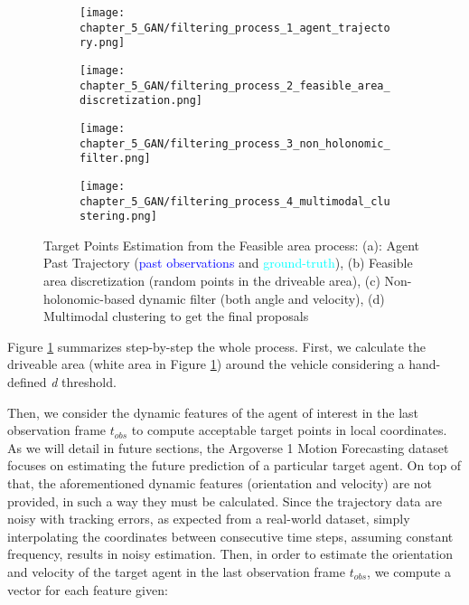 \begin{figure}[!ht]
	\centering
	\begin{subfigure}{0.24\textwidth}
		\texttt{[image: chapter\_5\_GAN/filtering\_process\_1\_agent\_trajectory.png]}	
		\caption{}
	\end{subfigure}
	\hfill
	\begin{subfigure}{0.24\textwidth}
		\texttt{[image: chapter\_5\_GAN/filtering\_process\_2\_feasible\_area\_discretization.png]}
		\caption{}
	\end{subfigure}
	\hfill
	\begin{subfigure}{0.24\textwidth}
		\texttt{[image: chapter\_5\_GAN/filtering\_process\_3\_non\_holonomic\_filter.png]}
		\caption{}
	\end{subfigure}
	\hfill
	\begin{subfigure}{0.24\textwidth}
		\texttt{[image: chapter\_5\_GAN/filtering\_process\_4\_multimodal\_clustering.png]}
		\caption{}
	\end{subfigure}
	\caption[Target Points Estimation from the Feasible area process]{Target Points Estimation from the Feasible area process: (a): Agent Past Trajectory (\textcolor{blue}{past observations} and \textcolor{aqua}{ground-truth}), (b) Feasible area discretization (random points in the driveable area), (c) Non-holonomic-based dynamic filter (both angle and velocity), (d) Multimodal clustering to get the final proposals}
	\label{fig:chapter_5_GAN/target_points_extraction}
\end{figure}

Figure \ref{fig:chapter_5_GAN/target_points_extraction} summarizes step-by-step the whole process. First, we calculate the driveable area (white area in Figure \ref{fig:chapter_5_GAN/target_points_extraction}) around the vehicle considering a hand-defined \textit{d} threshold.

Then, we consider the dynamic features of the agent of interest in the last observation frame $t_{obs}$ to compute acceptable target points in local coordinates. As we will detail in future sections, the Argoverse 1 Motion Forecasting dataset focuses on estimating the future prediction of a particular target agent. On top of that, the aforementioned dynamic features (orientation and velocity) are not provided, in such a way they must be calculated. Since the trajectory data are noisy with tracking errors, as expected from a real-world dataset, simply interpolating the coordinates between consecutive time steps, assuming constant frequency, results in noisy estimation. Then, in order to estimate the orientation and velocity of the target agent in the last observation frame $t_{obs}$, we compute a vector for each feature given:

